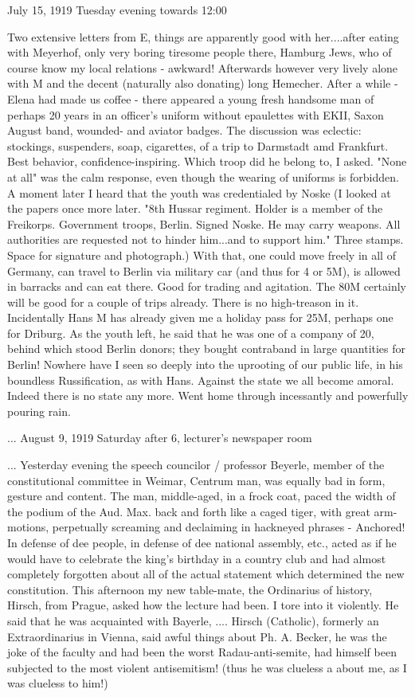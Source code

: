 July 15, 1919
Tuesday evening towards 12:00

Two extensive letters from E, things are apparently good with her....after eating with Meyerhof, only very boring tiresome people there, Hamburg Jews, who of course know my local relations - awkward! Afterwards however very lively alone with M and the {decent (naturally also donating) long} Hemecher. After a while - Elena had made us coffee - there appeared a young fresh handsome man of perhaps 20 years in an officer's uniform without epaulettes {with EKII, Saxon August band}, wounded- and aviator badges. {The discussion was eclectic}: stockings, suspenders, soap, cigarettes, of a trip to Darmstadt amd Frankfurt. Best behavior, confidence-inspiring. Which troop did he belong to, I asked. "None at all" was the calm response, even though the wearing of uniforms is forbidden. A moment later I heard that the youth was credentialed by Noske (I looked at the papers once more later. "8th Hussar regiment. Holder is a member of the Freikorps. Government troops, Berlin. Signed Noske. He may carry weapons. All authorities are requested not to hinder him...and to support him." Three stamps. Space for signature and photograph.) With that, one could move freely in all of Germany, can travel to Berlin via military car (and thus for 4 or 5M), is {allowed} in barracks and can eat there. {Good for trading and agitation. The 80M certainly will be good for a couple of trips already. There is no high-treason in it. Incidentally Hans M has already given me a holiday pass for 25M, perhaps one for Driburg}. As the youth left, he said that he was one of a company of 20, behind which stood Berlin donors; they bought contraband in large quantities for Berlin! Nowhere have I seen so deeply into the uprooting of our public life, in his boundless Russification, as with Hans. Against the state we all become amoral. Indeed there is no state any more. Went home through incessantly and powerfully pouring rain.

{...}
August 9, 1919
Saturday after 6, lecturer's newspaper room

{...}
Yesterday evening the speech councilor / professor Beyerle, member of the constitutional committee in Weimar, Centrum man, was equally bad in form, gesture and content. The man, middle-aged, in a frock coat, paced the width of the podium of the Aud. Max. back and forth like a caged tiger, with great arm-motions, perpetually screaming and declaiming in hackneyed phrases - Anchored! In defense of dee people, in defense of dee national assembly, etc., acted {as if he would have to celebrate the king's birthday in a country club} and had almost completely forgotten about all of the actual statement which determined the new constitution. This afternoon my new table-mate, the Ordinarius of history, Hirsch, from Prague, asked how the lecture had been. I tore into it violently. He said that he was acquainted with Bayerle, {...}.
Hirsch (Catholic), formerly an Extraordinarius in Vienna, said awful things about Ph. A. Becker, he was the joke of the faculty and had been the worst {Radau-}anti-semite, had himself been subjected to the most violent antisemitism! (thus he was clueless a about me, as I was clueless to him!)

